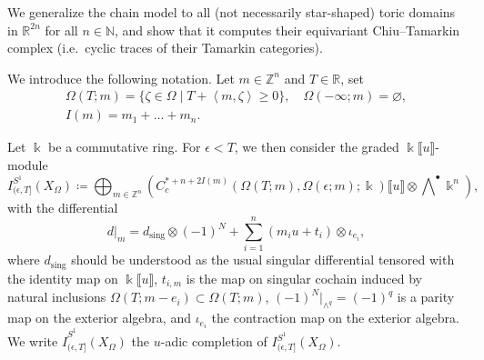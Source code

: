 \documentclass[11pt]{amsart}
\numberwithin{equation}{section}
\theoremstyle{plain}
\theoremstyle{definition}
\theoremstyle{remark}
\newcommand{\bZ} { {\mathbb{Z}}}
\newcommand{\bR} { {\mathbb{R}}}
\newcommand{\bN} { {\mathbb{N}}}
\newcommand{\fpw}[1]{{\llbracket #1\rrbracket}}
\begin{document}
We generalize the chain model to all (not necessarily star-shaped) toric domains in $\bR^{2n}$ for all $n \in \bN$, and show that it computes their equivariant Chiu--Tamarkin complex (i.e.~cyclic traces of their Tamarkin categories).

We introduce the following notation. Let $m \in \bZ^n$ and $T \in \bR$, set
\begin{gather*}
\Omega(T; m) = \{\zeta \in \Omega \mid T + \left< m, \zeta\right> \geq 0\}, \quad \Omega(-\infty;m)=\varnothing,\\
I(m) = m_1 + \dots + m_n.
\end{gather*}

Let $\Bbbk$ be a commutative ring. For $\epsilon<T$, we then consider the graded $\Bbbk\fpw{u}$-module
\[I_{(\epsilon,T]}^{S^1}(X_\Omega)\coloneqq \bigoplus_{m\in \bZ^n}\left( C^{*+n+2I(m)}_c({\Omega(T;m)},\Omega(\epsilon;m) ;\Bbbk  ) \fpw{u} \otimes \bigwedge\nolimits^\bullet \Bbbk ^n\right),\]
with the differential
\begin{equation*}d|_m=d_{\mathrm{sing}}\otimes (-1)^N+\sum_{i=1}^n  (m_iu+t_i)\otimes \iota_{e_i},\end{equation*}
where $d_\mathrm{sing}$ should be understood as the usual singular differential tensored with the identity map on $\Bbbk\fpw{u}$, $t_{i,m}$ is the map on singular cochain induced by natural inclusions $\Omega(T;m-e_i)\subset \Omega(T;m)$, $(-1)^N|_{\wedge^q}=(-1)^q$ is a parity map on the exterior algebra, and $\iota_{e_i}$ the contraction map on the exterior algebra. We write $\widehat{I}_{(\epsilon,T]}^{S^1}(X_\Omega)$ the $u$-adic completion of $I_{(\epsilon,T]}^{S^1}(X_\Omega)$. 
\end{document}
